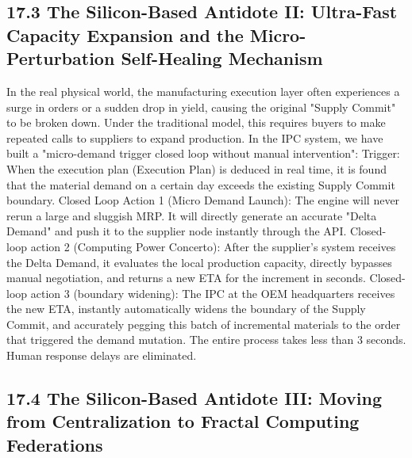 \documentclass[11pt,a4paper]{article}
\begin{document}
\subsection*{17.3 The Silicon-Based Antidote II: Ultra-Fast Capacity Expansion and the Micro-Perturbation Self-Healing Mechanism}


In the real physical world, the manufacturing execution layer often experiences a surge in orders or a sudden drop in yield, causing the original "Supply Commit" to be broken down. Under the traditional model, this requires buyers to make repeated calls to suppliers to expand production. In the IPC system, we have built a "micro-demand trigger closed loop without manual intervention": Trigger: When the execution plan (Execution Plan) is deduced in real time, it is found that the material demand on a certain day exceeds the existing Supply Commit boundary. Closed Loop Action 1 (Micro Demand Launch): The engine will never rerun a large and sluggish MRP. It will directly generate an accurate "Delta Demand" and push it to the supplier node instantly through the API. Closed-loop action 2 (Computing Power Concerto): After the supplier's system receives the Delta Demand, it evaluates the local production capacity, directly bypasses manual negotiation, and returns a new ETA for the increment in seconds. Closed-loop action 3 (boundary widening): The IPC at the OEM headquarters receives the new ETA, instantly automatically widens the boundary of the Supply Commit, and accurately pegging this batch of incremental materials to the order that triggered the demand mutation. The entire process takes less than 3 seconds. Human response delays are eliminated.


\subsection*{17.4 The Silicon-Based Antidote III: Moving from Centralization to Fractal Computing Federations}
\end{document}
